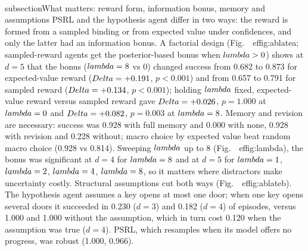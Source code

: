\documentclass[runningheads]{llncs}
\begin{document}
{\\subsection{What matters: reward form, information bonus, memory and assumptions}
PSRL and the hypothesis agent differ in two ways: the reward is formed from a sampled binding or from expected value under confidences, and only the latter had an information bonus. A factorial design (Fig.~\
ef{fig:ablate}a; sampled-reward agents get the posterior-based bonus when $\\lambda>0$) shows at $d=5$ that the bonus ($\\lambda=8$ vs $0$) changed success from 0.682 to 0.873 for expected-value reward ($\\Delta=+0.191$, $p<0.001$) and from 0.657 to 0.791 for sampled reward ($\\Delta=+0.134$, $p<0.001$); holding $\\lambda$ fixed, expected-value reward versus sampled reward gave $\\Delta=+0.026$, $p=1.000$ at $\\lambda=0$ and $\\Delta=+0.082$, $p=0.003$ at $\\lambda=8$. Memory and revision are necessary: success was 0.928 with full memory and 0.000 with none, 0.928 with revision and 0.228 without; macro choice by expected value beat random macro choice (0.928 vs 0.814). Sweeping $\\lambda$ up to 8 (Fig.~\
ef{fig:lambda}), the bonus was significant at $d=4$ for $\\lambda=8$ and at $d=5$ for $\\lambda=1$, $\\lambda=2$, $\\lambda=4$, $\\lambda=8$, so it matters where distractors make uncertainty costly. Structural assumptions cut both ways (Fig.~\
ef{fig:ablate}b). The hypothesis agent assumes a key opens at most one door; when one key opens several doors it succeeded in 0.230 ($d=3$) and 0.182 ($d=4$) of episodes, versus 1.000 and 1.000 without the assumption, which in turn cost 0.120 when the assumption was true ($d=4$). PSRL, which resamples when its model offers no progress, was robust (1.000, 0.966).

}
\end{document}
